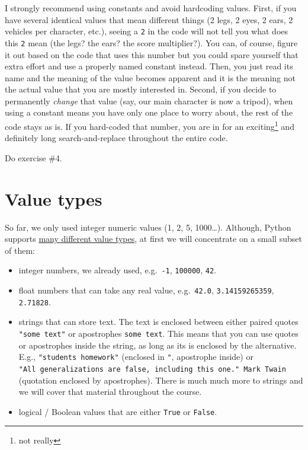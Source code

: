 \documentclass[
]{book}
\providecommand{\tightlist}{%
  \setlength{\itemsep}{0pt}\setlength{\parskip}{0pt}}
\begin{document}
I strongly recommend using constants and avoid hardcoding values. First, if you have several identical values that mean different things (2 legs, 2 eyes, 2 ears, 2 vehicles per character, etc.), seeing a \texttt{2} in the code will not tell you what does this \texttt{2} mean (the legs? the ears? the score multiplier?). You can, of course, figure it out based on the code that uses this number but you could spare yourself that extra effort and use a properly named constant instead. Then, you just read its name and the meaning of the value becomes apparent and it is the meaning not the actual value that you are mostly interested in. Second, if you decide to permanently \emph{change} that value (say, our main character is now a tripod), when using a constant means you have only one place to worry about, the rest of the code stays as is. If you hard-coded that number, you are in for an exciting\footnote{not really} and definitely long search-and-replace throughout the entire code.

Do exercise \#4.

\hypertarget{value-types}{%
\section{Value types}\label{value-types}}

So far, we only used integer numeric values (1, 2, 5, 1000\ldots). Although, Python supports \href{https://docs.python.org/3/library/stdtypes.html}{many different value types}, at first we will concentrate on a small subset of them:

\begin{itemize}
\tightlist
\item
  integer numbers, we already used, e.g.~\texttt{-1}, \texttt{100000}, \texttt{42}.
\item
  float numbers that can take any real value, e.g.~\texttt{42.0}, \texttt{3.14159265359}, \texttt{2.71828}.
\item
  strings that can store text. The text is enclosed between either paired quotes \texttt{"some\ text"} or apostrophes \texttt{\textquotesingle{}some\ text\textquotesingle{}}. This means that you can use quotes or apostrophes inside the string, as long as its is enclosed by the alternative. E.g., \texttt{"students\textquotesingle{}\ homework"} (enclosed in \texttt{"}, apostrophe \texttt{\textquotesingle{}} inside) or \texttt{\textquotesingle{}"All\ generalizations\ are\ false,\ including\ this\ one."\ Mark\ Twain\textquotesingle{}} (quotation enclosed by apostrophes). There is much much more to strings and we will cover that material throughout the course.
\item
  logical / Boolean values that are either \texttt{True} or \texttt{False}.
\end{itemize}
\end{document}
